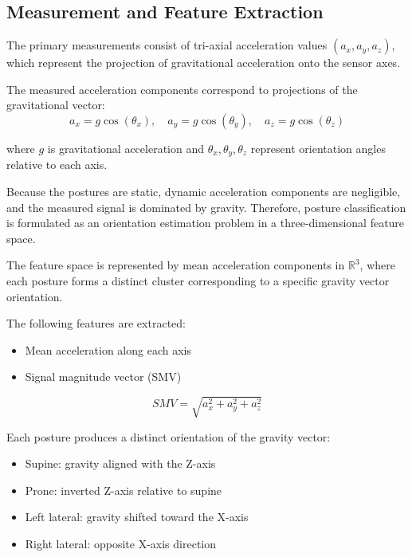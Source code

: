 \documentclass[conference]{IEEEtran}
\begin{document}
\subsection{Measurement and Feature Extraction}

The primary measurements consist of tri-axial acceleration values $(a_x, a_y, a_z)$, which represent the projection of gravitational acceleration onto the sensor axes.

The measured acceleration components correspond to projections of the gravitational vector:
\begin{equation}
a_x = g \cos(\theta_x), \quad a_y = g \cos(\theta_y), \quad a_z = g \cos(\theta_z)
\end{equation}

where $g$ is gravitational acceleration and $\theta_x, \theta_y, \theta_z$ represent orientation angles relative to each axis.

Because the postures are static, dynamic acceleration components are negligible, and the measured signal is dominated by gravity. Therefore, posture classification is formulated as an orientation estimation problem in a three-dimensional feature space.

The feature space is represented by mean acceleration components in $\mathbb{R}^3$, where each posture forms a distinct cluster corresponding to a specific gravity vector orientation.

The following features are extracted:
\begin{itemize}
    \item Mean acceleration along each axis
    \item Signal magnitude vector (SMV)
\end{itemize}

\begin{equation}
SMV = \sqrt{a_x^2 + a_y^2 + a_z^2}
\end{equation}

Each posture produces a distinct orientation of the gravity vector:
\begin{itemize}
    \item Supine: gravity aligned with the Z-axis
    \item Prone: inverted Z-axis relative to supine
    \item Left lateral: gravity shifted toward the X-axis
    \item Right lateral: opposite X-axis direction
\end{itemize}
\end{document}
